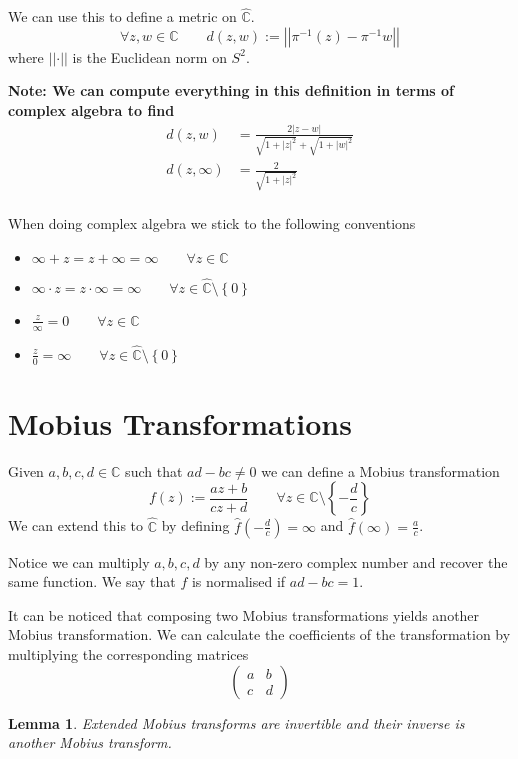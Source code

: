 \documentclass[11pt]{article}
\newcommand{\defeq}{:=}
\newcommand{\abs}[1]{\left|#1\right|}
\newcommand{\norm}[1]{\left|\left|#1\right|\right|}
\newcommand{\C}{\mathbb{C}}
\newcommand{\mdf}[1]{{\color{red} #1}}
\newenvironment{note}
	{\begin{mdframed}[backgroundcolor=white, linecolor=red, roundcorner=5pt, linewidth=1pt]\bfseries{Note:}\normalfont}
	{\end{mdframed}}
\newtheorem{lemma}[theorem]{Lemma}
\begin{document}
We can use this to define a metric on $\hat{\C}$.
\[
	\forall z, w\in \C \quad\quad d(z, w)\defeq\norm{\pi^{-1}(z) - \pi^{-1}w}
\]
where $\norm{\cdot}$ is the Euclidean norm on $S^2$.

\begin{note}
We can compute everything in this definition in terms of complex algebra to find
\begin{align*}
	d(z, w) &= \frac{2\abs{z-w}}{\sqrt{1+\abs{z}^2}+\sqrt{1+\abs{w}^2}}\\	
	d(z, \infty) &= \frac{2}{\sqrt{1+\abs{z}^2}}\\	
\end{align*}
\end{note}
When doing complex algebra we stick to the following conventions
\begin{itemize}
	\item $\infty + z = z + \infty = \infty \quad\quad\forall z\in\C$
	\item $\infty \cdot z = z \cdot \infty = \infty \quad\quad\forall z\in\hat{\C}\setminus\left\{0\right\}$
	\item $\frac{z}{\infty}=0 \quad\quad\forall z\in\C$
	\item $\frac{z}{0}=\infty \quad\quad\forall z\in\hat{\C}\setminus\left\{0\right\}$
\end{itemize}
\section{Mobius Transformations}

Given $a, b, c, d\in \C$ such that $ad-bc\neq 0$ we can define a \mdf{Mobius transformation}
\[
	f(z)\defeq\frac{az+b}{cz+d}\quad\quad\forall z\in\C\setminus\left\{-\frac{d}{c}\right\}
\]
We can extend this to $\hat{\C}$ by defining $\hat{f}(-\frac{d}{c})=\infty$ and $\hat{f}(\infty)=\frac{a}{c}$.

Notice we can multiply $a, b, c, d$ by any non-zero complex number and recover the same function.
We say that $f$ is \mdf{normalised} if $ad-bc=1$.

It can be noticed that composing two Mobius transformations yields another Mobius transformation.
We can calculate the coefficients of the transformation by multiplying the corresponding matrices
\[
\begin{pmatrix}
	a & b \\
	c & d
\end{pmatrix}
\]
\begin{lemma}
Extended Mobius transforms are invertible and their inverse is another Mobius transform.
\end{lemma}
\end{document}
